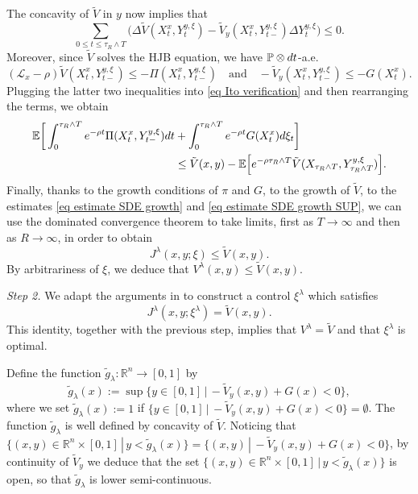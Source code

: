 \documentclass[11pt]{amsart}
\theoremstyle{plain}
\def \dd{{\rm d}}
\def \R{\mathbb{R}}
\numberwithin{equation}{section}
\begin{document}
The concavity of $\tilde V$ in $y$ now implies that
$$
\sum_{0\leq t\leq \tau_R\wedge T} \Big( \Delta \tilde V  (X^x_t,Y^{y,\xi}_{t}) - \tilde V _y (X^x_t,Y^{y,\xi}_{t-})\Delta Y^{y,\xi}_t \Big) \leq 0.
$$
Moreover, since $\tilde V$ solves the HJB equation, we have $\mathbb P \otimes \dd t$-a.e.
$$
(\mathcal{L}_x - \rho) \tilde V (X^x_t,Y^{y,\xi}_{t-}) \leq - \Pi(X^x_t,Y^{y,\xi}_{t-})
\quad \text{and}\quad
- \tilde V_y(X^x_t, Y^{y,\xi}_{t-}) \leq - G(X^x_t).
$$
Plugging the latter two inequalities into \eqref{eq Ito verification} and then rearranging the terms,  we obtain
$$
\begin{aligned}
 \mathbb{E}\bigg[\int_0^{\tau_R\wedge T} e^{-\rho t} \Pi(X^x_t,Y^{y,\xi}_{t-})    \dd t  
     &+ \int_0^{\tau_R\wedge T} e^{-\rho t} G (X^x_t) \dd \xi_t \bigg]\\
     & \leq 
     \tilde V (x,y) -
      \mathbb{E}\Big[e^{-\rho \tau_R \wedge T } \tilde V(X_{\tau_R\wedge T},Y^{y,\xi}_{\tau_R\wedge T})\Big].
\end{aligned}
$$
Finally, thanks to the growth conditions of $\pi$ and $G$, to the growth of $\tilde V$, to the estimates \eqref{eq estimate SDE growth} and \eqref{eq estimate SDE growth SUP},
we can use the dominated convergence theorem to take limits, first as $T \to \infty$ and then as $R\to \infty$, in order to obtain 
$$
J^\lambda (x,y;\xi) \leq \tilde V(x,y).
$$
By arbitrariness of $\xi$, we deduce that $V^\lambda(x,y) \leq \tilde V(x,y)$.


\smallbreak\noindent
\emph{Step 2.}
We adapt the arguments in \cite{deangelis.ferrari.federico.2017optimal} to construct a control $\xi^\lambda$ which satisfies 
$$
J^\lambda (x,y;\xi^\lambda) = \tilde V(x,y).
$$
This identity, together with the previous step, implies that $V^\lambda = \tilde V$ and that $\xi^\lambda$ is optimal.

Define the function $\tilde g_\lambda : \R^n \to [0,1]$ by
$$
   \tilde g_\lambda (x) := \sup \big\{ y \in[0,1]  \, | \, - \tilde V _y (x,y) +  G(x) < 0 \big\},
$$
where we set $\tilde g_\lambda (x):=1$ if $\{ y \in[0,1] \, | \, - \tilde V _y (x,y) +  G(x) < 0 \} = \emptyset$.
The function $ \tilde g_\lambda$ is well defined by concavity of $\tilde V$.
Noticing that $\{ (x,y) \in \R^n \times [0,1] \, | \, y< \tilde g_\lambda(x) \} = \{ (x,y) \, | \, - \tilde V _y (x,y) +  G(x) < 0 \}$, by continuity of $\tilde V _y$ we deduce that the set $\{ (x,y) \in \R^n \times [0,1] \, | \, y<\tilde g_\lambda(x) \}$ is open, so that $\tilde g_\lambda$ is lower semi-continuous.
\end{document}
